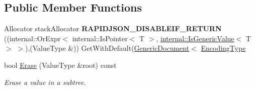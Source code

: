 \subsection*{Public Member Functions}
\begin{DoxyCompactItemize}
\item 
\mbox{\label{classGenericPointer_aebf325c6fde06adfc4d959b507d7f170}} 
Allocator stack\+Allocator {\bfseries R\+A\+P\+I\+D\+J\+S\+O\+N\+\_\+\+D\+I\+S\+A\+B\+L\+E\+I\+F\+\_\+\+R\+E\+T\+U\+RN} ((internal\+::\+Or\+Expr$<$ internal\+::\+Is\+Pointer$<$ T $>$, \hyperlink{structinternal_1_1IsGenericValue}{internal\+::\+Is\+Generic\+Value}$<$ T $>$ $>$),(Value\+Type \&)) Get\+With\+Default(\hyperlink{classGenericDocument}{Generic\+Document}$<$ \hyperlink{classGenericPointer_a4b802da797a7a0b615fd9611cedb7c3b}{Encoding\+Type}
\item 
bool \hyperlink{classGenericPointer_a759c07e81c9738e7a2a68b36d5c28643}{Erase} (Value\+Type \&root) const
\begin{DoxyCompactList}\small\item\em Erase a value in a subtree. \end{DoxyCompactList}\end{DoxyCompactItemize}
